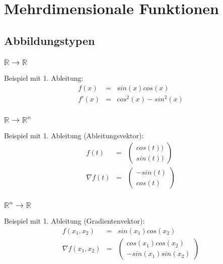 
\section{Mehrdimensionale Funktionen} %
\label{sec:mehrdimensionale_funktionen}
\subsection{Abbildungstypen} %
\label{sub:abbildungstypen}

\subsubsection{$\mathbb{R} \rightarrow \mathbb{R}$}
\label{ssub:rr}
Beispiel mit 1. Ableitung:
\begin{eqnarray*}
	f(x) &=& sin(x)cos(x) \\
	f'(x) &=& cos^2(x)-sin^2(x)
\end{eqnarray*}

\subsubsection{$\mathbb{R} \rightarrow \mathbb{R}^n$}
\label{ssub:rrn}
Beispiel mit 1. Ableitung (Ableitungsvektor):
\begin{eqnarray*}
	f(t) &=& \left(\begin{array}{c} cos(t)) \\ sin(t))\end{array}\right) \\
	\nabla f(t) &=& \left( \begin{array}{c} -sin(t) \\ cos(t)\end{array} \right)
\end{eqnarray*}

\subsubsection{$\mathbb{R}^n \rightarrow \mathbb{R}$}
\label{ssub:rne}
Beispiel mit 1. Ableitung (Gradientenvektor):
\begin{eqnarray*}
	f(x_1,x_2) &=& sin(x_1)cos(x_2) \\
	\nabla f(x_1,x_2) &=& \left( \begin{array}{c} cos(x_1) cos(x_2) \\ -sin(x_1)sin(x_2) \end{array} \right)
\end{eqnarray*}
	
